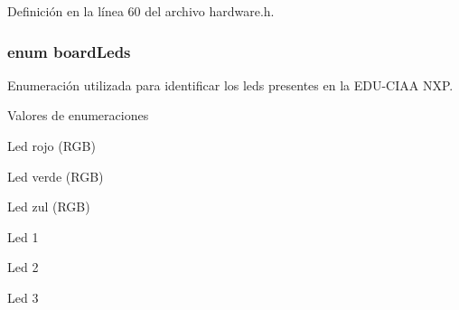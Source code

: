 Definición en la línea 60 del archivo hardware.\+h.

\subsubsection[{\texorpdfstring{board\+Leds}{boardLeds}}]{\setlength{\rightskip}{0pt plus 5cm}enum {\bf board\+Leds}}\hypertarget{group__hardware_ga2a000bf02da2abba53355f3fcfdb2d0b}{}\label{group__hardware_ga2a000bf02da2abba53355f3fcfdb2d0b}


Enumeración utilizada para identificar los leds presentes en la E\+D\+U-\/\+C\+I\+AA N\+XP. 

\begin{Desc}
\item[Valores de enumeraciones]\par
\begin{description}
\item[{\em 
led4\hypertarget{group__hardware_gga2a000bf02da2abba53355f3fcfdb2d0ba76aaf0c615e41c008aa876ea4c183f4c}{}\label{group__hardware_gga2a000bf02da2abba53355f3fcfdb2d0ba76aaf0c615e41c008aa876ea4c183f4c}
}]Led rojo (R\+GB) \item[{\em 
led5\hypertarget{group__hardware_gga2a000bf02da2abba53355f3fcfdb2d0ba66b97e4de94e08d049b57ac98e315cad}{}\label{group__hardware_gga2a000bf02da2abba53355f3fcfdb2d0ba66b97e4de94e08d049b57ac98e315cad}
}]Led verde (R\+GB) \item[{\em 
led6\hypertarget{group__hardware_gga2a000bf02da2abba53355f3fcfdb2d0ba2c4a58277fd326a128900fe0904c2b1e}{}\label{group__hardware_gga2a000bf02da2abba53355f3fcfdb2d0ba2c4a58277fd326a128900fe0904c2b1e}
}]Led zul (R\+GB) \item[{\em 
led1\hypertarget{group__hardware_gga2a000bf02da2abba53355f3fcfdb2d0bacc803913e7d21f9a6900861008580c5f}{}\label{group__hardware_gga2a000bf02da2abba53355f3fcfdb2d0bacc803913e7d21f9a6900861008580c5f}
}]Led 1 \item[{\em 
led2\hypertarget{group__hardware_gga2a000bf02da2abba53355f3fcfdb2d0ba9c2c88fba1581ccd42348c9e3c47df92}{}\label{group__hardware_gga2a000bf02da2abba53355f3fcfdb2d0ba9c2c88fba1581ccd42348c9e3c47df92}
}]Led 2 \item[{\em 
led3\hypertarget{group__hardware_gga2a000bf02da2abba53355f3fcfdb2d0ba16d63d90ec9dc8c27019e7c28ff1cfc0}{}\label{group__hardware_gga2a000bf02da2abba53355f3fcfdb2d0ba16d63d90ec9dc8c27019e7c28ff1cfc0}
}]Led 3 \end{description}
\end{Desc}


